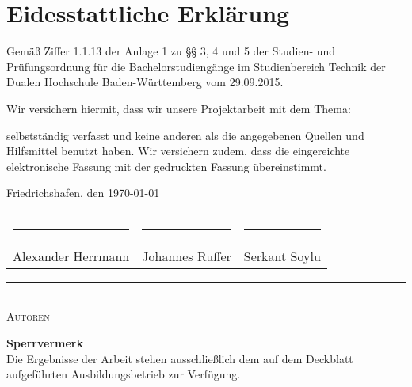 \chapter*{Eidesstattliche Erklärung} %


Gemäß Ziffer 1.1.13 der Anlage 1 zu §§ 3, 4 und 5  der Studien- und Prüfungsordnung für die Bachelorstudiengänge im Studienbereich Technik der Dualen Hochschule Baden-Würt­tem­berg vom 29.09.2015.

Wir versichern hiermit, dass wir unsere Projektarbeit mit dem Thema: 

\begin{quote}
	\textit{\titel} \textit{ \untertitel }
\end{quote}

selbstständig verfasst und keine anderen als die angegebenen Quellen und Hilfsmittel benutzt haben. Wir versichern zudem, dass die eingereichte elektronische Fassung mit der gedruckten Fassung übereinstimmt.

Friedrichshafen, den \today \\[2ex]

\begin{center}

\begin{tabular}{ccc}
	\rule[-0.2cm]{0.3\linewidth}{0.5pt} & \rule[-0.2cm]{0.3\linewidth}{0.5pt} & \rule[-0.2cm]{0.3\linewidth}{0.5pt}\\
	Alexander Herrmann & Johannes Ruffer & Serkant Soylu\\
\end{tabular}

\rule{0.75\linewidth}{0.1pt}\\
\textsc{Autoren} \\[10ex]
\end{center}


\noindent \textbf{\Large{Sperrvermerk}}\\
\normalsize
Die Ergebnisse der Arbeit stehen ausschließlich dem auf dem Deckblatt aufgeführten Ausbildungsbetrieb zur Verfügung.

\normalsize

\rmfamily



\cleardoublepage